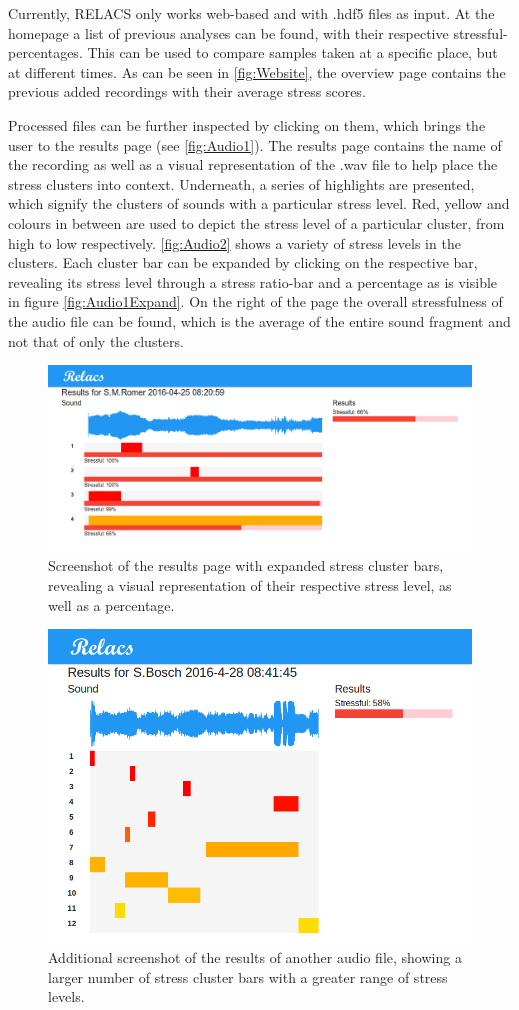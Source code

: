 \documentclass[a4paper]{article}
\begin{document}
Currently, RELACS only works web-based and with .hdf5 files as input. At the homepage a list of previous analyses can be found, with their respective stressful-percentages. This can be used to compare samples taken at a specific place, but at different times. As can be seen in \autoref{fig:Website}, the overview page contains the previous added recordings with their average stress scores.

Processed files can be further inspected by clicking on them, which brings the user to the results page (see \autoref{fig:Audio1}). The results page contains the name of the recording as well as a visual representation of the .wav file to help place the stress clusters into context. Underneath, a series of highlights are presented, which signify the clusters of sounds with a particular stress level. Red, yellow and colours in between are used to depict the stress level of a particular cluster, from high to low respectively. \autoref{fig:Audio2} shows a variety of stress levels in the clusters. Each cluster bar can be expanded by clicking on the respective bar, revealing its stress level through a stress ratio-bar and a percentage as is visible in figure \autoref{fig:Audio1Expand}. On the right of the page the overall stressfulness of the audio file can be found, which is the average of the entire sound fragment and not that of only the clusters.

\begin{figure}[h]
\centering
\includegraphics[width=0.9\linewidth]{./Audio1ResultsExpand}
\caption{Screenshot of the results page with expanded stress cluster bars, revealing a visual representation of their respective stress level, as well as a percentage.}
\label{fig:Audio1Expand}
\end{figure}

\begin{figure}[h]
\centering
\includegraphics[width=0.6\linewidth]{./Audio2Results}
\caption{Additional screenshot of the results of another audio file, showing a larger number of stress cluster bars with a greater range of stress levels.}
\label{fig:Audio2}
\end{figure}
\end{document}

